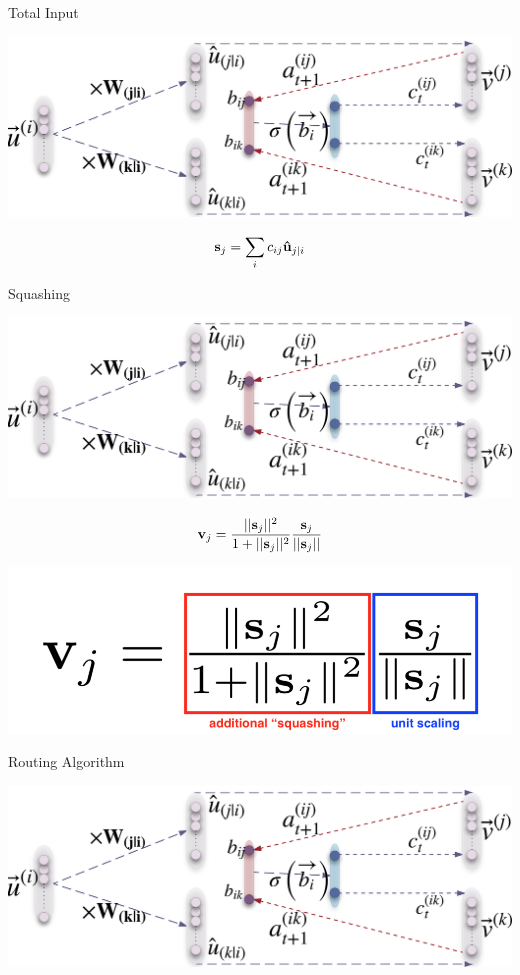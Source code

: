\documentclass{beamer}
\begin{document}
{    \begin{frame}{Total Input}
      \begin{center}
        \includegraphics[width=.6\textwidth]{../img/capsRouting.png}
      \end{center}
      \pause

      \begin{equation}
        {\bf s}_j = \sum_i c_{ij} {\bf \hat{u}}_{j|i}
        \label{eq:total-input}
      \end{equation}
    \end{frame}

    \begin{frame}{Squashing}
      \begin{center}
        \includegraphics[width=.6\textwidth]{../img/capsRouting.png}
      \end{center}
      \pause

      \begin{equation}
        {\bf v}_j = \frac{||{\bf s}_j||^2}{1+||{\bf s}_j||^2} \frac{{\bf s}_j}{||{\bf s}_j||}
        \label{eq:squash}
      \end{equation}
      \pause
      \begin{center}
        \includegraphics[width=.7\textwidth]{../img/squashing.png}
      \end{center}
    \end{frame}

    \begin{frame}{Routing Algorithm}
      \begin{center}
        \includegraphics[width=.6\textwidth]{../img/capsRouting.png}
      \end{center}
      \pause


\end{frame}}
\end{document}
